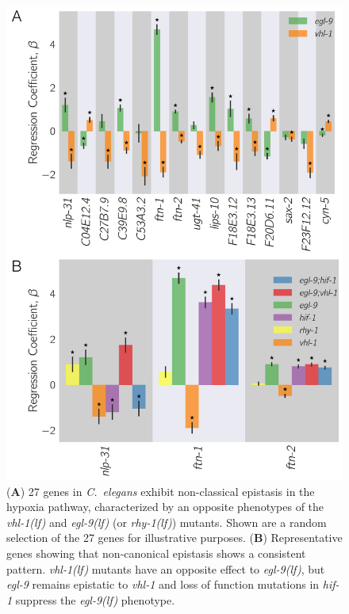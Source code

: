 \documentclass[9pt,twocolumn,twoside]{pnas-new}
\newcommand{\cel}{\emph{C.~elegans}}
\newcommand{\gene}[1]{\emph{#1}}
\newcommand{\egl}{\emph{egl-9(lf)}}
\newcommand{\rhy}{\emph{rhy-1(lf)}}
\newcommand{\vhl}{\emph{vhl-1(lf)}}
\begin{document}
\begin{figure}[tbhp]
\centering
\includegraphics[width=\linewidth]{figs/hif1oh_epistasis.pdf}
\caption{
(\textbf{A}) 27 genes in \cel{} exhibit non-classical epistasis in the hypoxia
pathway, characterized by an opposite phenotypes of the \vhl{} and \egl{} (or
\rhy{}) mutants. Shown are a random selection of the 27 genes for illustrative
purposes.
(\textbf{B}) Representative genes showing that non-canonical epistasis shows a
consistent pattern. \vhl{} mutants have an opposite effect to \egl{}, but
\gene{egl-9} remains epistatic to \gene{vhl-1} and loss of function mutations in
\gene{hif-1} suppress the \egl{} phenotype.
}
\label{fig:hif1oh}
\end{figure}
\end{document}
